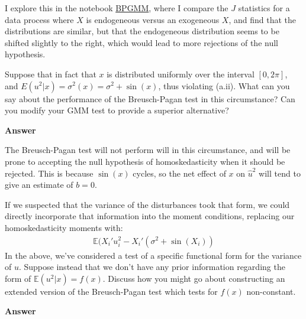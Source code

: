 \documentclass[11pt]{exam}
\begin{document}
\begin{questions}
I explore this in the notebook \href{https://github.com/lghackett/are212_finalexam/blob/master/BP_GMM.ipynb}{BPGMM}, where I compare the $J$ statistics for a data process where $X$ is endogeneous versus an exogeneous $X$, and find that the distributions are similar, but that the endogeneous distribution seems to be shifted slightly to the right, which would lead to more rejections of the null hypothesis. 

    \question Suppose that in fact that \(x\) is distributed uniformly
over the interval \([0,2\pi]\), and \(E(u^2|x) = \sigma^2(x) = \sigma^2 + \sin(x)\), thus violating (a.ii). What can you say about the performance of the Breusch-Pagan test in this circumstance? Can you modify your GMM test to provide a superior
alternative?

\textbf{Answer}

The Breusch-Pagan test will not perform will in this circumstance, and
will be prone to accepting the null hypothesis of homoskedasticity when
it should be rejected. This is because \(\sin(x)\) cycles, so the net
effect of \(x\) on \(\hat{u}^2\) will tend to give an estimate of
\(b=0\).

If we suspected that the variance of the disturbances took that form, we
could directly incorporate that information into the moment conditions,
replacing our homoskedasticity moments with:
\begin{align*}
\mathbb{E}(X_i'u_i^2 - X_i'(\sigma^2 +\sin(X_i))
\end{align*}
    \question In the above, we've considered a test of a specific
functional form for the variance of \(u\). Suppose instead that we don't
have any prior information regarding the form of
\(\mathbb{E}(u^2|x) = f(x)\). Discuss how you might go about
constructing an extended version of the Breusch-Pagan test which tests
for \(f(x)\) non-constant.

\textbf{Answer}


\end{questions}
\end{document}
